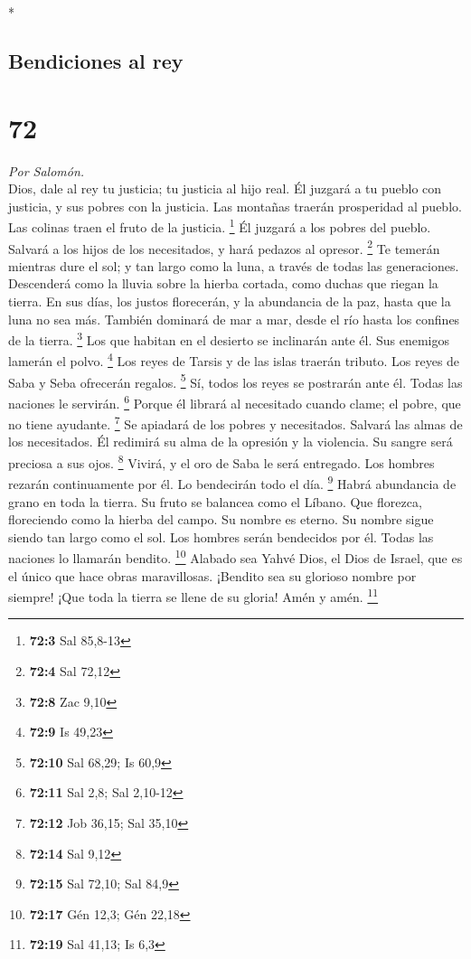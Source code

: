 \begin{paracol}{2}
\begin{otherlanguage}{english}
\end{otherlanguage}

\switchcolumn[0]*

\hypertarget{bendiciones-al-rey}{%
\subsection{Bendiciones al rey}\label{bendiciones-al-rey}}

\hypertarget{section-142}{%
\section{72}\label{section-142}}

\emph{Por Salomón.}\\
 Dios, dale al rey tu justicia; tu justicia al hijo real.
 Él juzgará a tu pueblo con justicia, y sus pobres con la
justicia.  Las montañas traerán prosperidad al pueblo. Las
colinas traen el fruto de la justicia. \footnote{\textbf{72:3} Sal
  85,8-13}  Él juzgará a los pobres del pueblo. Salvará a
los hijos de los necesitados, y hará pedazos al opresor. \footnote{\textbf{72:4}
  Sal 72,12}  Te temerán mientras dure el sol; y tan largo
como la luna, a través de todas las generaciones. 
Descenderá como la lluvia sobre la hierba cortada, como duchas que
riegan la tierra.  En sus días, los justos florecerán, y
la abundancia de la paz, hasta que la luna no sea más. 
También dominará de mar a mar, desde el río hasta los confines de la
tierra. \footnote{\textbf{72:8} Zac 9,10}  Los que habitan
en el desierto se inclinarán ante él. Sus enemigos lamerán el polvo.
\footnote{\textbf{72:9} Is 49,23}  Los reyes de Tarsis y
de las islas traerán tributo. Los reyes de Saba y Seba ofrecerán
regalos. \footnote{\textbf{72:10} Sal 68,29; Is 60,9} 
Sí, todos los reyes se postrarán ante él. Todas las naciones le
servirán. \footnote{\textbf{72:11} Sal 2,8; Sal 2,10-12} 
Porque él librará al necesitado cuando clame; el pobre, que no tiene
ayudante. \footnote{\textbf{72:12} Job 36,15; Sal 35,10} 
Se apiadará de los pobres y necesitados. Salvará las almas de los
necesitados.  Él redimirá su alma de la opresión y la
violencia. Su sangre será preciosa a sus ojos. \footnote{\textbf{72:14}
  Sal 9,12}  Vivirá, y el oro de Saba le será entregado.
Los hombres rezarán continuamente por él. Lo bendecirán todo el día.
\footnote{\textbf{72:15} Sal 72,10; Sal 84,9}  Habrá
abundancia de grano en toda la tierra. Su fruto se balancea como el
Líbano. Que florezca, floreciendo como la hierba del campo.
 Su nombre es eterno. Su nombre sigue siendo tan largo
como el sol. Los hombres serán bendecidos por él. Todas las naciones lo
llamarán bendito. \footnote{\textbf{72:17} Gén 12,3; Gén 22,18}
 Alabado sea Yahvé Dios, el Dios de Israel, que es el
único que hace obras maravillosas.  ¡Bendito sea su
glorioso nombre por siempre! ¡Que toda la tierra se llene de su gloria!
Amén y amén. \footnote{\textbf{72:19} Sal 41,13; Is 6,3}


\end{paracol}
